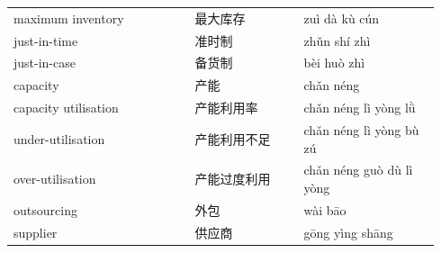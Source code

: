 \documentclass[11pt]{article}
\begin{document}
\begin{longtable}{@{}p{0.40\linewidth}p{0.24\linewidth}p{0.30\linewidth}@{}}
maximum inventory & 最大库存 & zuì dà kù cún \\
just-in-time & 准时制 & zhǔn shí zhì \\
just-in-case & 备货制 & bèi huò zhì \\
capacity & 产能 & chǎn néng \\
capacity utilisation & 产能利用率 & chǎn néng lì yòng lǜ \\
under-utilisation & 产能利用不足 & chǎn néng lì yòng bù zú \\
over-utilisation & 产能过度利用 & chǎn néng guò dù lì yòng \\
outsourcing & 外包 & wài bāo \\
supplier & 供应商 & gōng yìng shāng \\
\end{longtable}
\end{document}

